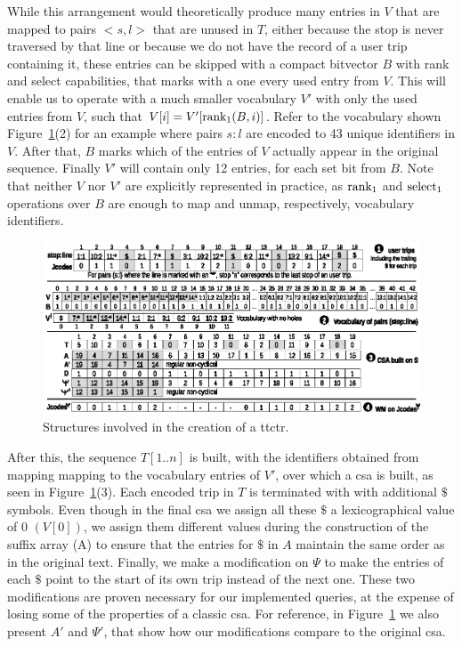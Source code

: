     While this arrangement would theoretically produce many entries in $V$ that are mapped to pairs $<s,l>$ that are unused in $T$, either because the stop is never traversed by that line or because we do not have the record of a user trip containing it, these entries can be skipped with a compact bitvector $B$ with rank and select capabilities, that marks with a one every used entry from $V$. This will enable us to operate with a much smaller vocabulary $V'$ with only the used entries from $V$, such that $V[i] = V'[\operatorname{rank}_1(B,i)]$. Refer to the vocabulary shown Figure~\ref{fig:ttctr}(2) for an example where pairs $s:l$ are encoded to 43 unique identifiers in $V$. After that, $B$ marks which of the entries of $V$ actually appear in the original sequence. Finally $V'$ will contain only 12 entries, for each set bit from $B$. Note that neither $V$ nor $V'$ are explicitly represented in practice, as $\operatorname{rank}_1$ and $\operatorname{select}_1$ operations over $B$ are enough to map and unmap, respectively, vocabulary identifiers.

    \begin{figure}[ht]
        \includegraphics[width=1.00\textwidth]{figures/ttctr2019.eps}
    	\caption{Structures involved in the creation of a \acrshort{ttctr}.}
    	\label{fig:ttctr}
    \end{figure}
    
    After this, the sequence $T[1..n]$ is built, with the identifiers obtained from mapping mapping to the vocabulary entries of $V'$, over which a \gls{csa} is built, as seen in Figure~\ref{fig:ttctr}(3). Each encoded trip in $T$ is terminated with with additional $\$$ symbols. Even though in the final \gls{csa} we assign all these $\$$ a lexicographical value of 0 $(V[0])$, we assign them different values during the construction of the suffix array (A) to ensure that the entries for $\$$ in $A$ maintain the same order as in the original text. Finally, we make a modification on $\Psi$ to make the entries of each $\$$ point to the start of its own trip instead of the next one. These two modifications are proven necessary for our implemented queries, at the expense of losing some of the properties of a classic \gls{csa}. For reference, in Figure~\ref{fig:ttctr} we also present $A'$ and $\Psi'$, that show how our modifications compare to the original \gls{csa}.

